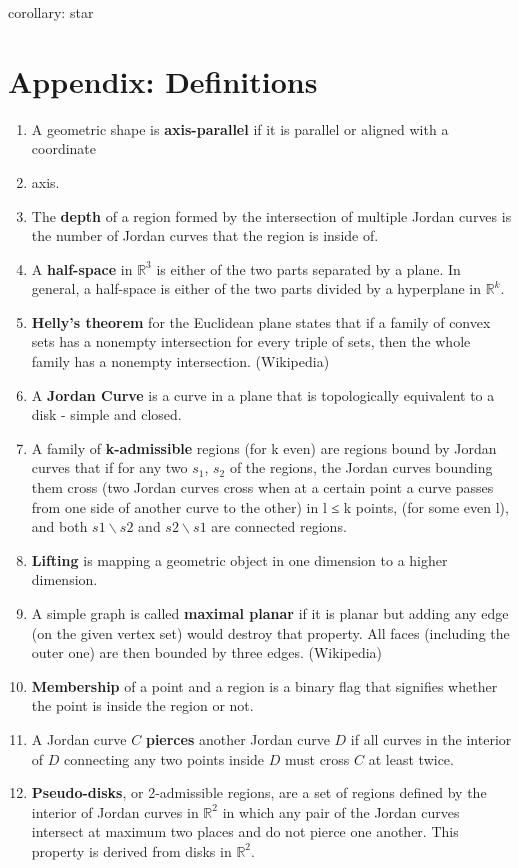 \documentclass{NSF}
\begin{document}
corollary: star

\newpage
\section{Appendix: Definitions}
\begin{enumerate}
\item A geometric shape is \textbf{axis-parallel} if it is parallel or aligned with a coordinate 
\item axis.
\item The \textbf{depth} of a region formed by the intersection of multiple Jordan curves is the number of Jordan curves that the region is inside of.
\item A \textbf{half-space} in $\mathbb{R}^3$ is either of the two parts separated by a plane. In general, a half-space is either of the two parts divided by a hyperplane in $\mathbb{R}^k$.
\item \textbf{Helly's theorem} for the Euclidean plane states that if a family of convex sets has a nonempty intersection for every triple of sets, then the whole family has a nonempty intersection. (Wikipedia)
\item A \textbf{Jordan Curve} is a curve in a plane that is topologically equivalent to a disk - simple and closed.
\item A family of \textbf{k-admissible} regions (for k even) are regions bound by Jordan curves that if for any two $s_1$, $s_2$ of the regions, the Jordan curves bounding them cross (two Jordan curves cross when at a certain point a curve passes from one side of another curve to the other) in l ≤ k points, (for some even l), and both $s1\backslash s2$ and $s2\backslash s1$ are connected regions. \cite{Pyrga:2008:NEP:1377676.1377708}
\item \textbf{Lifting} is mapping a geometric object in one dimension to a higher dimension.
\item A simple graph is called \textbf{maximal planar} if it is planar but adding any edge (on the given vertex set) would destroy that property. All faces (including the outer one) are then bounded by three edges. (Wikipedia)
\item \textbf{Membership} of a point and a region is a binary flag that signifies whether the point is inside the region or not.
\item A Jordan curve $C$ \textbf{pierces} another Jordan curve $D$ if all curves in the interior of $D$ connecting any two points inside $D$ must cross $C$ at least twice.
\item \textbf{Pseudo-disks}, or 2-admissible regions, are a set of regions defined by the interior of Jordan curves in $\mathbb{R}^2$ in which any pair of the Jordan curves intersect at maximum two places and do not pierce one another. This property is derived from disks in $\mathbb{R}^2$.

\end{enumerate}
\end{document}
